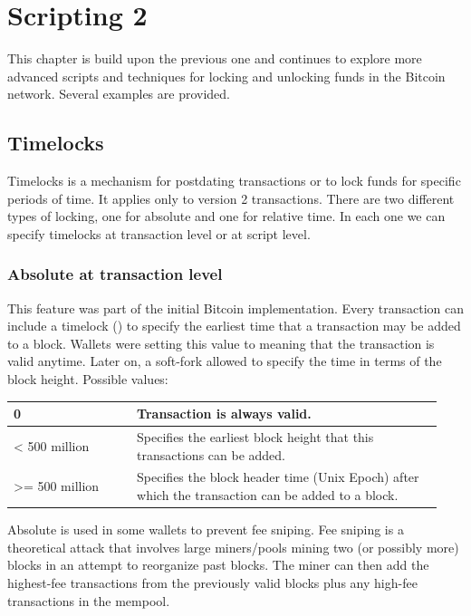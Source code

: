 \chapter{Scripting 2}

\begin{summary}
This chapter is build upon the previous one and continues to explore more advanced scripts and techniques for locking and unlocking funds in the Bitcoin network. Several examples are provided.
\end{summary}

\section{Timelocks}
Timelocks is a mechanism for postdating transactions or to lock funds for specific periods of time. It applies only to version 2 transactions. There are two different types of locking, one for absolute and one for relative time. In each one we can specify timelocks at transaction level or at script level. 

\subsection*{Absolute at transaction level}
This feature was part of the initial Bitcoin implementation. Every transaction can include a timelock () to specify the earliest time that a transaction may be added to a block. Wallets were setting this value to  meaning that the transaction is valid anytime. Later on, a soft-fork allowed to specify the time in terms of the block height. Possible values:

\begin{table}[h]
\centering
\begin{tabular}[H]{ |L{0.27\linewidth}|L{0.67\linewidth}| }
 & Transaction is always valid.\\
\hline
< 500 million & Specifies the earliest block height that this transactions can be added.\\
\hline
>= 500 million & Specifies the block header time (Unix Epoch) after which the transaction can be added to a block.\\
\hline
\end{tabular}
\end{table}

Absolute  is used in some wallets to prevent fee sniping. Fee sniping is a theoretical attack that involves large miners/pools mining two (or possibly more) blocks in an attempt to reorganize past blocks. The miner can then add the highest-fee transactions from the previously valid blocks plus any high-fee transactions in the mempool.

